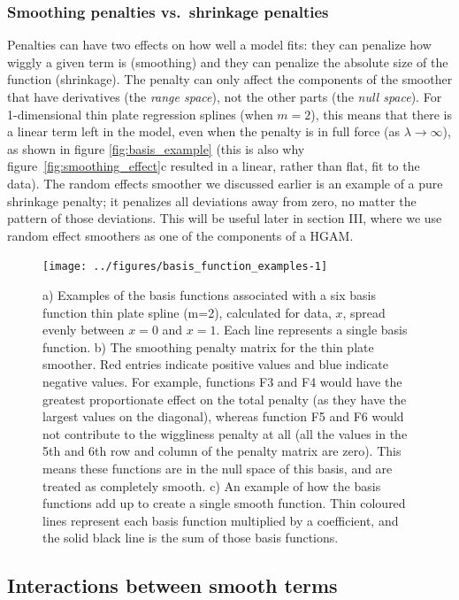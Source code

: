 \documentclass[12pt]{article}
\begin{document}
\subsubsection{Smoothing penalties vs.~shrinkage
penalties}\label{smoothing-penalties-vs.shrinkage-penalties}

Penalties can have two effects on how well a model fits: they can
penalize how wiggly a given term is (smoothing) and they can penalize
the absolute size of the function (shrinkage). The penalty can only
affect the components of the smoother that have derivatives (the
\emph{range space}), not the other parts (the \emph{null space}). For
1-dimensional thin plate regression splines (when \(m=2\)), this means
that there is a linear term left in the model, even when the penalty is
in full force (as \(\lambda \rightarrow \infty\)), as shown in figure
\ref{fig:basis_example} (this is also why
figure~\ref{fig:smoothing_effect}c resulted in a linear, rather than
flat, fit to the data). The random effects smoother we discussed earlier
is an example of a pure shrinkage penalty; it penalizes all deviations
away from zero, no matter the pattern of those deviations. This will be
useful later in section III, where we use random effect smoothers as one
of the components of a HGAM.

\begin{figure}
\texttt{[image: ../figures/basis\_function\_examples-1]} \caption{\label{fig:basis_example}a) Examples of the basis functions associated with a six basis function thin plate spline (m=2), calculated for data, $x$, spread evenly between $x=0$ and $x=1$. Each line represents a single basis function. b) The smoothing  penalty matrix for the thin plate smoother. Red entries indicate positive values and blue indicate negative values.  For example, functions F3 and F4 would have the greatest proportionate effect on the total penalty (as they have the largest values on the diagonal), whereas function F5 and F6 would not contribute to the wiggliness penalty at all (all the values in the 5th and 6th row and column of the penalty matrix are zero). This means these functions are in the null space of this basis, and are treated as completely smooth. c) An example of how the basis functions add up to create a single smooth function. Thin coloured lines represent each basis function multiplied by a coefficient, and the solid black line is the sum of those basis functions.}\label{fig:basis_function_examples}
\end{figure}

\subsection{Interactions between smooth
terms}\label{interactions-between-smooth-terms}
\end{document}
